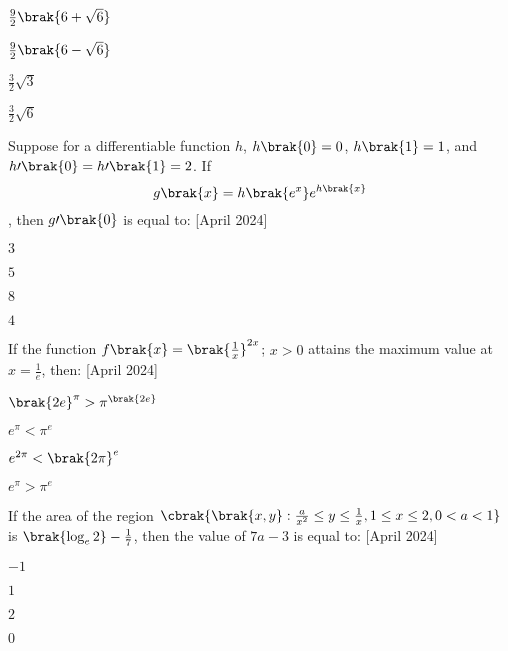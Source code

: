 \begin{enumerate}
\begin{multicols}{4}
\item $\frac{9}{2}\brak{6+\sqrt{6}}$
\item $\frac{9}{2}\brak{6-\sqrt{6}}$
\item $\frac{3}{2}\sqrt{3}$
\item $\frac{3}{2}\sqrt{6}$
\end{multicols}
\end{enumerate}
\item Suppose for a differentiable function $h$, $h\brak{0} = 0$, $h\brak{1} = 1$, and $h\prime\brak{0} = h\prime\brak{1} = 2$. If $$g\brak{x} = h\brak{e^x}e^{h\brak{x}}$$, then $g\prime\brak{0}$ is equal to: \hfill{[April 2024]}
\begin{enumerate}
\begin{multicols}{4}
\item $3$
\item $5$
\item $8$
\item $4$
\end{multicols}
\end{enumerate}
\item If the function $f\brak{x} = \brak{\frac{1}{x}}^{2x}$; $x > 0$ attains the maximum value at $x = \frac{1}{e}$, then: \hfill{[April 2024]}
\begin{enumerate}
\begin{multicols}{4}
\item $\brak{2e}^\pi > \pi^{\brak{2e}}$
\item $e^\pi < \pi^e$
\item $e^{2\pi} < \brak{2\pi}^e$
\item $e^\pi > \pi^e$
\end{multicols}
\end{enumerate}
\item If the area of the region $\cbrak{\brak{x, y}:\frac{a}{x^2}\leq y\leq \frac{1}{x}, 1 \leq x \leq 2, 0 < a < 1}$ is $\brak{\log_e 2} -\frac{1}{7}$, then the value of $7a - 3$ is equal to: \hfill{[April 2024]}
\begin{enumerate}
\begin{multicols}{4}
\item $-1$
\item $1$
\item $2$
\item $0$
\end{multicols}
\end{enumerate}
